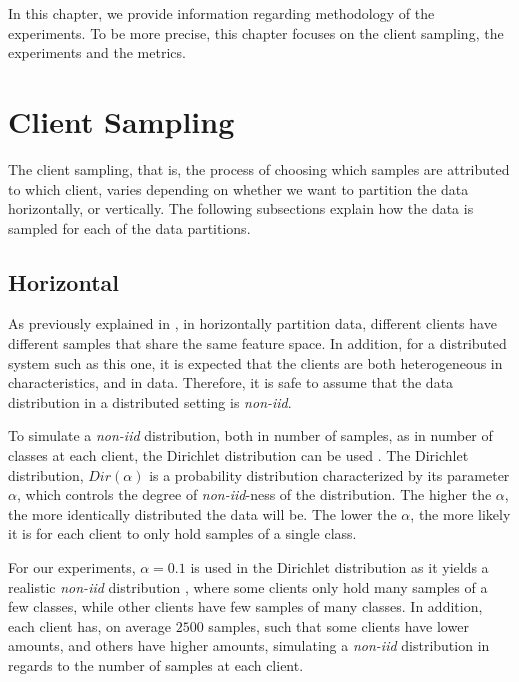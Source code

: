 In this chapter, we provide information regarding methodology of the experiments. To be more precise, this chapter focuses on the client sampling, the experiments and the metrics.

\section{Client Sampling}\label{meth:client_sampling}

The client sampling, that is, the process of choosing which samples are attributed to which client, varies depending on whether we want to partition the data horizontally, or vertically. The following subsections explain how the data is sampled for each of the data partitions.

\subsection{Horizontal}

As previously explained in , in horizontally partition data, different clients have different samples that share the same feature space. In addition, for a distributed system such as this one, it is expected that the clients are both heterogeneous in characteristics, and in data. Therefore, it is safe to assume that the data distribution in a distributed setting is \textit{non-iid}.

To simulate a \textit{non-iid} distribution, both in number of samples, as in number of classes at each client, the Dirichlet distribution can be used \cite{tim, 10.48550/arxiv.2006.07242}. The Dirichlet distribution, $Dir(\alpha)$ is a probability distribution characterized by its parameter $\alpha$, which controls the degree of \textit{non-iid}-ness of the distribution. The higher the $\alpha$, the more identically distributed the data will be. The lower the $\alpha$, the more likely it is for each client to only hold samples of a single class.

For our experiments, $\alpha = 0.1$ is used in the Dirichlet distribution as it yields a realistic \textit{non-iid} distribution \cite{10.48550/arxiv.2006.07242}, where some clients only hold many samples of a few classes, while other clients have few samples of many classes. In addition, each client has, on average $2500$ samples, such that some clients have lower amounts, and others have higher amounts, simulating a \textit{non-iid} distribution in regards to the number of samples at each client.

